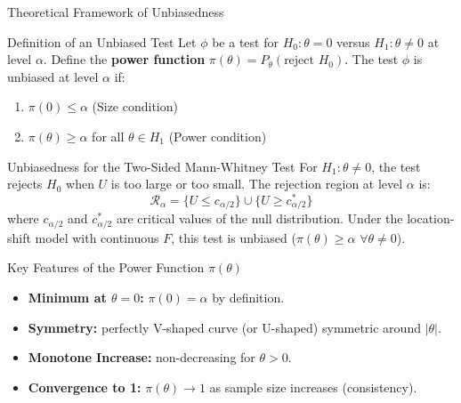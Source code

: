 \documentclass[8pt]{beamer}
\begin{document}
\begin{frame}{Theoretical Framework of Unbiasedness}
    \footnotesize %
    
    \begin{block}{Definition of an Unbiased Test}
        Let $\phi$ be a test for $H_0: \theta = 0$ versus $H_1: \theta \neq 0$ at level $\alpha$.
        Define the \textbf{power function} $\pi(\theta) = P_\theta(\text{reject } H_0)$. The test $\phi$ is unbiased at level $\alpha$ if:
        \begin{enumerate}
            \item $\pi(0) \leq \alpha$ (Size condition)
            \item $\pi(\theta) \geq \alpha$ for all $\theta \in H_1$ (Power condition)
        \end{enumerate}
    \end{block}

    \begin{block}{Unbiasedness for the Two-Sided Mann-Whitney Test}
        For $H_1: \theta \neq 0$, the test rejects $H_0$ when $U$ is too large or too small. The rejection region at level $\alpha$ is:
        \[ \mathcal{R}_\alpha = \{U \leq c_{\alpha/2}\} \cup \{U \geq c_{\alpha/2}^*\} \]
        where $c_{\alpha/2}$ and $c_{\alpha/2}^*$ are critical values of the null distribution. Under the location-shift model with continuous $F$, this test is unbiased ($\pi(\theta) \geq \alpha \,\, \forall \theta \neq 0$).
    \end{block}

    \begin{exampleblock}{Key Features of the Power Function $\pi(\theta)$}
        \begin{itemize}
            \item \textbf{Minimum at $\theta=0$:} $\pi(0) = \alpha$ by definition.
            \item \textbf{Symmetry:} perfectly V-shaped curve (or U-shaped) symmetric around $|\theta|$.
            \item \textbf{Monotone Increase:} non-decreasing for $\theta > 0$.
            \item \textbf{Convergence to 1:} $\pi(\theta) \to 1$ as sample size increases (consistency).
        \end{itemize}
    \end{exampleblock}
\end{frame}
\end{document}
